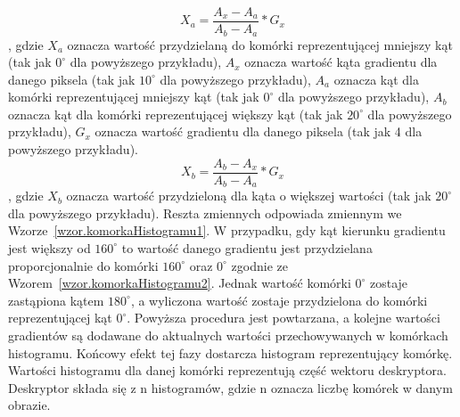 \documentclass[a4paper,twoside,12pt]{book}
\begin{document}
    \large
    \begin{equation}
        X_{a} = \frac{A_{x}-A_{a}}{A_{b}-A_{a}}*G_{x}
        \label{wzor.komorkaHistogramu1}
    \end{equation}
    \normalsize
    , gdzie $X_{a}$ oznacza wartość przydzielaną do komórki reprezentującej mniejszy kąt (tak jak $0^{\circ}$
    dla powyższego przykładu), $A_{x}$ oznacza wartość kąta gradientu dla danego piksela (tak jak $10^{\circ}$
    dla powyższego przykładu), $A_{a}$ oznacza kąt dla komórki reprezentującej mniejszy kąt (tak jak $0^{\circ}$
    dla powyższego przykładu), $A_{b}$ oznacza kąt dla komórki reprezentującej większy kąt (tak jak $20^{\circ}$
    dla powyższego przykładu), $G_{x}$ oznacza wartość gradientu dla danego piksela (tak jak 4 dla powyższego
    przykładu).
    \large
    \begin{equation}
        X_{b} = \frac{A_{b}-A_{x}}{A_{b}-A_{a}}*G_{x}
        \label{wzor.komorkaHistogramu2}
    \end{equation}
    \normalsize
    , gdzie $X_{b}$ oznacza wartość przydzieloną dla kąta o większej wartości (tak jak $20^{\circ}$
    dla powyższego przykładu). Reszta zmiennych odpowiada zmiennym we Wzorze~\ref{wzor.komorkaHistogramu1}.
    W przypadku, gdy kąt kierunku gradientu jest większy od $160^{\circ}$ to wartość danego gradientu jest
    przydzielana proporcjonalnie do komórki $160^{\circ}$ oraz $0^{\circ}$ zgodnie ze
    Wzorem~\ref{wzor.komorkaHistogramu2}. Jednak wartość komórki $0^{\circ}$ zostaje zastąpiona kątem $180^{\circ}$,
    a wyliczona wartość zostaje przydzielona do komórki reprezentującej kąt $0^{\circ}$.
    Powyższa procedura jest powtarzana, a kolejne wartości gradientów są dodawane do aktualnych wartości przechowywanych
    w komórkach histogramu. Końcowy efekt tej fazy dostarcza histogram reprezentujący komórkę. Wartości histogramu
    dla danej komórki reprezentują część wektoru deskryptora. Deskryptor składa się z n histogramów, gdzie n oznacza
    liczbę komórek w danym obrazie.
\end{document}
